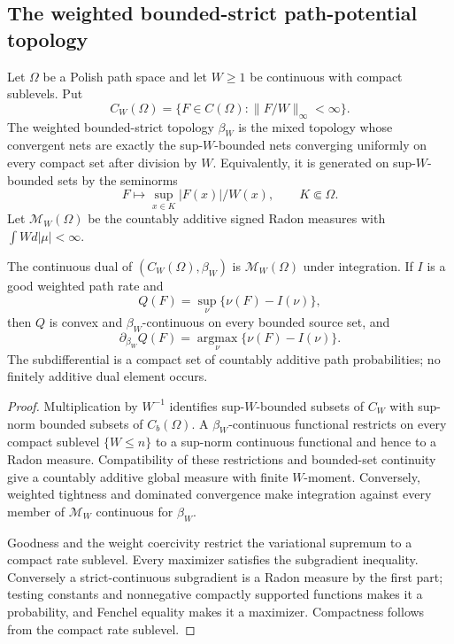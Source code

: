 \subsection{The weighted bounded-strict path-potential topology}

Let \(\Omega\) be a Polish path space and let \(W\ge1\) be continuous with
compact sublevels.  Put
\[
 C_W(\Omega)=\{F\in C(\Omega):\|F/W\|_\infty<\infty\}.
\]
The weighted bounded-strict topology \(\beta_W\) is the mixed topology whose
convergent nets are exactly the sup-\(W\)-bounded nets converging uniformly on
every compact set after division by \(W\).  Equivalently, it is generated on
sup-\(W\)-bounded sets by the seminorms
\[
 F\longmapsto\sup_{x\in K}|F(x)|/W(x),
 \qquad K\Subset\Omega.
\]
Let \(\mathcal M_W(\Omega)\) be the countably additive signed Radon measures
with \(\int Wd|\mu|<\infty\).

\begin{theorem}
\label{thm:r3-c2-strict}
The continuous dual of \((C_W(\Omega),\beta_W)\) is
\(\mathcal M_W(\Omega)\) under integration.  If \(I\) is a good weighted path
rate and
\[
 Q(F)=\sup_\nu\{\nu(F)-I(\nu)\},
\]
then \(Q\) is convex and \(\beta_W\)-continuous on every bounded source set,
and
\[
 \partial_{\beta_W}Q(F)
 =\operatorname*{argmax}_\nu\{\nu(F)-I(\nu)\}.
\]
The subdifferential is a compact set of countably additive path
probabilities; no finitely additive dual element occurs.
\end{theorem}

\begin{proof}
Multiplication by \(W^{-1}\) identifies sup-\(W\)-bounded subsets of
\(C_W\) with sup-norm bounded subsets of \(C_b(\Omega)\).  A
\(\beta_W\)-continuous functional restricts on every compact sublevel
\(\{W\le n\}\) to a sup-norm continuous functional and hence to a Radon
measure.  Compatibility of these restrictions and bounded-set continuity give
a countably additive global measure with finite \(W\)-moment.  Conversely,
weighted tightness and dominated convergence make integration against every
member of \(\mathcal M_W\) continuous for \(\beta_W\).

Goodness and the weight coercivity restrict the variational supremum to a
compact rate sublevel.  Every maximizer satisfies the subgradient inequality.
Conversely a strict-continuous subgradient is a Radon measure by the first
part; testing constants and nonnegative compactly supported functions makes it
a probability, and Fenchel equality makes it a maximizer.  Compactness follows
from the compact rate sublevel.
\end{proof}

